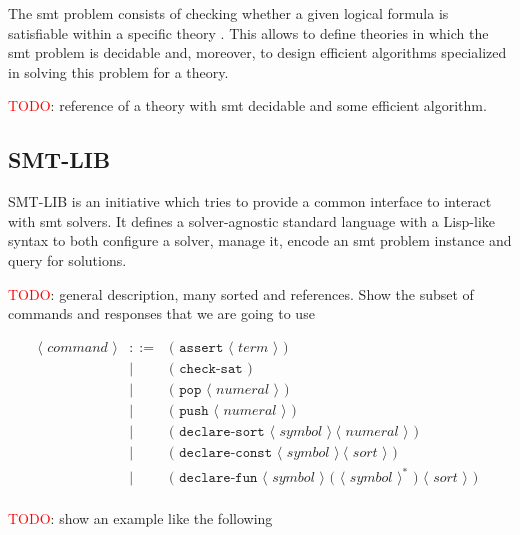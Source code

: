The \gls{smt} problem consists of checking whether
a given logical formula is satisfiable within a specific theory
\citep{smtLibStandard}. This allows to define theories in which the \gls{smt} problem
is decidable and, moreover, to design efficient algorithms specialized in 
solving this problem for a theory.

\textcolor{red}{TODO}: reference of a theory with smt decidable and some 
efficient algorithm.

\subsection{SMT-LIB}
\label{prelim:smtlib}

SMT-LIB is an initiative which tries to provide a common interface to interact
with \acrshort{smt} solvers. It defines a solver-agnostic standard language
with a Lisp-like syntax to both configure a solver, manage it, encode an
\gls{smt} problem instance and query for solutions.

\textcolor{red}{TODO}: general description, many sorted and references. 
Show the subset of commands and responses that we are going to use

\[
\begin{array}{rcll}
\langle\textit{ command }\rangle & ::= & \texttt{( assert } \langle\textit{ term }\rangle\texttt{ ) }\\
& | & \texttt{( check-sat )}\\
& | & \texttt{( pop } \langle\textit{ numeral }\rangle \texttt{ ) }\\
& | & \texttt{( push } \langle\textit{ numeral }\rangle \texttt{ ) }\\
& | & \texttt{( declare-sort } \langle\textit{ symbol }\rangle~\langle\textit{ numeral }\rangle\texttt{ ) }\\
& | & \texttt{( declare-const } \langle\textit{ symbol }\rangle~\langle\textit{ sort }\rangle\texttt{ ) }\\
& | & \texttt{( declare-fun } \langle\textit{ symbol }\rangle \texttt{ ( }\langle\textit{ symbol }\rangle^* \texttt{ ) }\langle\textit{ sort }\rangle\texttt{ ) }\\
\end{array}
\]

\textcolor{red}{TODO}: show an example like the following

